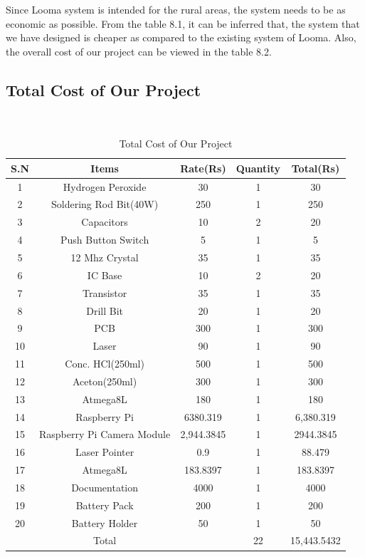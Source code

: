\documentclass[12pt, a4paper]{article}
\begin{document}
Since Looma system is intended for the rural areas, the system needs to be as economic as possible. From the table 8.1, it can be inferred that, the system that we have designed is cheaper as compared to the existing system of Looma. Also, the overall cost of our project can be viewed in the table 8.2.
\clearpage
\subsection{Total Cost of Our Project}
~\\
\begin{table}[ht]
\begin{tabular}{|c|c|c|c|c|}
\hline
	S.N & Items & Rate(Rs) & Quantity & Total(Rs) \\
\hline
	1 & Hydrogen Peroxide & 30 & 1 & 30 \\
\hline
	2 & Soldering Rod Bit(40W) & 250 & 1 & 250 \\
\hline
	3 & Capacitors & 10 & 2 & 20 \\
\hline
	4 & Push Button Switch & 5 & 1 & 5 \\
\hline
	5 & 12 Mhz Crystal & 35 & 1 & 35 \\
\hline
	6 & IC Base & 10 & 2 & 20 \\
\hline
	7 & Transistor & 35 & 1 & 35 \\
\hline
	8 & Drill Bit & 20 & 1 & 20 \\
\hline
	9 & PCB & 300 & 1 & 300 \\
\hline
	10 & Laser & 90 & 1 & 90 \\
\hline
	11 & Conc. HCl(250ml) & 500 & 1 & 500 \\
\hline
	12 & Aceton(250ml) & 300 & 1 & 300 \\
\hline
	13 & Atmega8L & 180 & 1 & 180 \\
\hline
	14 & Raspberry Pi & 6380.319 & 1 & 6,380.319 \\
\hline
	15 & Raspberry Pi Camera Module & 2,944.3845 & 1 & 2944.3845 \\
\hline
	16 & Laser Pointer &  0.9 & 1 & 88.479 \\
\hline 
    17 & Atmega8L & 183.8397 & 1 & 183.8397 \\
\hline
	18 & Documentation &  4000 & 1 & 4000 \\
\hline
	19 & Battery Pack & 200 & 1 & 200 \\
\hline 
    20 & Battery Holder & 50 & 1 & 50 \\
\hline 
	   & Total & & 22 & 15,443.5432\\
\hline	   
\end{tabular}
\caption{Total Cost of Our Project}
\label{tb:sw}
\end{table}
\newpage
\end{document}
